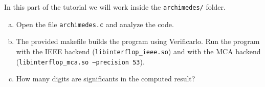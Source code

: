 In this part of the tutorial we will work inside the \texttt{archimedes/} folder.

\begin{question}
  \begin{enumerate}[(a)]
    \item Open the file \texttt{archimedes.c} and analyze the code.
    \item The provided makefile builds the program using Verificarlo. Run the program
      with the IEEE backend (\texttt{libinterflop\_ieee.so}) and with the MCA backend
      (\texttt{libinterflop\_mca.so --precision 53}).
    \item How many digits are significants in the computed result?
  \end{enumerate}
\end{question}










